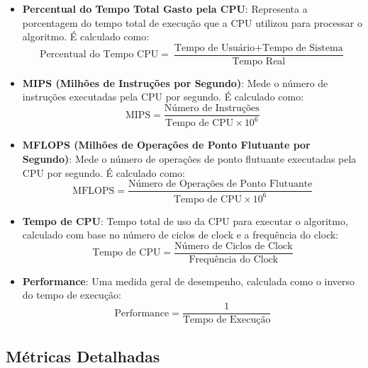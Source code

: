 \documentclass[12pt]{article}
\begin{document}
\begin{itemize}
    \item \textbf{Percentual do Tempo Total Gasto pela CPU}: Representa a porcentagem do tempo total de execução que a CPU utilizou para processar o algoritmo. É calculado como:
    \begin{equation}
    \text{Percentual do Tempo CPU} = \frac{\text{Tempo de Usuário} + \text{Tempo de Sistema}}{\text{Tempo Real}}
    \end{equation}

    \item \textbf{MIPS (Milhões de Instruções por Segundo)}: Mede o número de instruções executadas pela CPU por segundo. É calculado como:
    \begin{equation}
    \text{MIPS} = \frac{\text{Número de Instruções}}{\text{Tempo de CPU} \times 10^6}
    \end{equation}

    \item \textbf{MFLOPS (Milhões de Operações de Ponto Flutuante por Segundo)}: Mede o número de operações de ponto flutuante executadas pela CPU por segundo. É calculado como:
    \begin{equation}
    \text{MFLOPS} = \frac{\text{Número de Operações de Ponto Flutuante}}{\text{Tempo de CPU} \times 10^6}
    \end{equation}

    \item \textbf{Tempo de CPU}: Tempo total de uso da CPU para executar o algoritmo, calculado com base no número de ciclos de clock e a frequência do clock:
    \begin{equation}
    \text{Tempo de CPU} = \frac{\text{Número de Ciclos de Clock}}{\text{Frequência do Clock}}
    \end{equation}

    \item \textbf{Performance}: Uma medida geral de desempenho, calculada como o inverso do tempo de execução:
    \begin{equation}
    \text{Performance} = \frac{1}{\text{Tempo de Execução}}
    \end{equation}
\end{itemize}

\subsection{Métricas Detalhadas}
\end{document}
